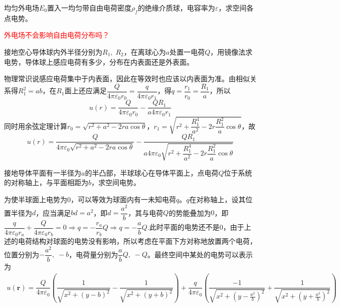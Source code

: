 \documentclass{mynote}
\begin{document}
\begin{exercise}{2.6}
    均匀外电场$E_0$置入一均匀带自由电荷密度$\rho_f$的绝缘介质球，电容率为$\varepsilon$，求空间各点电势。
\end{exercise}
\textcolor{red}{外电场不会影响自由电荷分布吗？}







\begin{exercise}{2.9}
    接地空心导体球内外半径分别为$R_1,\; R_2$，在离球心为$a$处置一电荷$Q$，用镜像法求电势，导体球上感应电荷有多少，分布在内表面还是外表面。
\end{exercise}
\begin{solution}
    物理常识说感应电荷集中于内表面，因此在等效时也应该以内表面为准。由相似关系得$R_1^2 = ab$，在$R_1$面上还应满足$\dfrac{Q}{4\pi \varepsilon_0 r_0} = \dfrac{q}{4\pi \varepsilon_0 r_1}$，得$q = \dfrac{r_1}{r_0} = \dfrac{R_1}{a}$，所以
    \[
    u(r) = \dfrac{Q}{4\pi \varepsilon_0 r_0} - \dfrac{QR_1}{a 4 \pi \varepsilon_0 r_1}
    \]
    同时用余弦定理计算$r_0 = \sqrt{r^2 + a^2 - 2ra\cos \theta}$，$r_1 = \sqrt{r^2 + \dfrac{R_1^4}{a^2} - 2r\dfrac{R_1^2}{a} \cos \theta}$，故
    \[
    u(r) = \dfrac{Q}{4\pi \varepsilon_0 \sqrt{r^2 + a^2 - 2ra\cos \theta}} - \dfrac{QR_1}{a 4 \pi \varepsilon_0 \sqrt{r^2 + \dfrac{R_1^4}{a^2} - 2r\dfrac{R_1^2}{a} \cos \theta}}
    \]
\end{solution}






\begin{exercise}{2.11}
    接地导体平面有一半径为$a$的半凸部，半球球心在导体平面上，点电荷$Q$位于系统的对称轴上，与平面相距为$b$，求空间电势。
\end{exercise}
\begin{solution}
    为使半球面上电势为$0$，可以等效为球面内有一未知电荷$q$。$q$在对称轴上，设其位置半径为$d$，应当满足$bd=a^2$，即$d = \dfrac{a^2}{b}$，其与电荷$Q$的势能叠加为$0$，即$\dfrac{q}{4\pi \varepsilon_0 r_a} + \dfrac{Q}{4\pi \varepsilon_0 r_b} = 0 \Rightarrow q = -\dfrac{r_a}{r_b} Q \Rightarrow q = -\dfrac{a}{b}Q$.此时平面的电势还不是$0$，由于上述的电荷结构对球面的电势没有影响，所以考虑在平面下方对称地放置两个电荷，位置分别为$-\dfrac{a^2}{b},\; -b$，电荷量分别为$\dfrac{a}{b}Q,\; -Q$。最终空间中某处的电势可以表示为
    \begin{align*}
        u(\bm{r}) = \dfrac{Q}{4\pi \varepsilon_0} \left( \dfrac{1}{\sqrt{x^2 + (y-b)^2}} - \dfrac{1}{\sqrt{x^2 + (y+b)^2}} \right) + \dfrac{q}{4\pi \varepsilon_0} \left( \dfrac{-1}{\sqrt{x^2 + (y-\frac{a^2}{b})^2}} + \dfrac{1}{\sqrt{x^2 + (y+\frac{a^2}{b})^2}} \right)
    \end{align*}
\end{solution}
\end{document}
